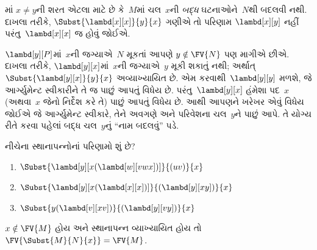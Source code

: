 \documentclass[../../../include/open-logic-section]{subfiles}
\begin{document}
\begin{explain}
માં
$x \neq y$ની શરત એટલા માટે છે કે~$M$માં ચલ~$x$ની
\emph{બદ્ધ} ઘટનાઓને~$N$થી બદલવી નથી. દાખલા તરીકે,
$\Subst{\lambd[x][x]}{y}{x}$ ગણીએ તો પરિણામ
$\lambd[x][y]$ નહીં પરંતુ~$\lambd[x][x]$ જ હોવું જોઈએ.

$\lambd[y][P]$માં~$x$ની જગ્યાએ~$N$ મૂકતાં આપણે
$y \notin \FV{N}$ પણ માગીએ છીએ. દાખલા તરીકે,
$\lambd[y][x]$માં~$x$ની જગ્યાએ~$y$ મૂકી શકાતું નથી;
અર્થાત્~$\Subst{\lambd[y][x]}{y}{x}$ અવ્યાખ્યાયિત છે.
એમ કરવાથી~$\lambd[y][y]$ મળશે, જે આર્ગ્યુમેન્ટ સ્વીકારીને
તે જ પાછું આપતું વિધેય છે. પરંતુ~$\lambd[y][x]$ હંમેશા
પદ~$x$ (અથવા~$x$ જેનો નિર્દેશ કરે તે) પાછું આપતું વિધેય છે.
આથી આપણને ખરેખર એવું વિધેય જોઈએ જે આર્ગ્યુમેન્ટ સ્વીકારે,
તેને અવગણે અને પરિવેશના ચલ~$y$ને પાછું આપે. તે યોગ્ય રીતે
કરવા પહેલાં બદ્ધ ચલ~$y$નું ``નામ બદલવું'' પડે.
\end{explain}

\begin{prob}
  નીચેના સ્થાનાપન્નોનાં પરિણામો શું છે?
  \begin{enumerate}
  \item $\Subst{\lambd[y][x(\lambd[w][vwx])]}{(uv)}{x}$
  \item $\Subst{\lambd[y][x(\lambd[x][x])]}{(\lambd[y][xy])}{x}$
  \item $\Subst{y(\lambd[v][xv])}{(\lambd[y][vy])}{x}$
  \end{enumerate}
\end{prob}

\begin{thm} 
  $x \notin \FV{M}$ હોય અને સ્થાનાપન્ન વ્યાખ્યાયિત હોય તો
  $\FV{\Subst{M}{N}{x}} = \FV{M}$.
\end{thm}
\end{document}
